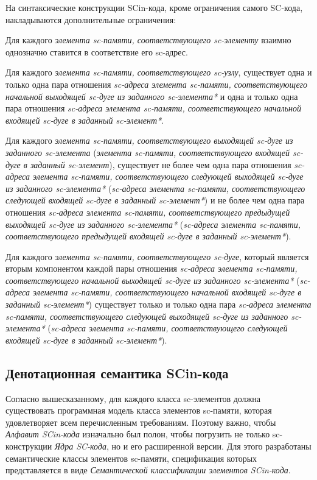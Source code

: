 На синтаксические конструкции SCin-кода, кроме ограничения самого SC-кода, накладываются дополнительные ограничения:
\begin{textitemize}
    \item Для каждого \textit{элемента sc-памяти, соответствующего sc-элементу} взаимно однозначно ставится в соответствие его sc-адрес.
    \item Для каждого \textit{элемента sc-памяти, соответствующего sc-узлу}, существует одна и только одна пара отношения \textit{sc-адреса элемента sc-памяти, соответствующего начальной выходящей sc-дуге из заданного sc-элемента*} и одна и только одна пара отношения \textit{sc-адреса элемента sc-памяти, соответствующего начальной входящей sc-дуге в заданный sc-элемент*}.
    \item Для каждого \textit{элемента sc-памяти, соответствующего выходящей sc-дуге из заданного sc-элемента} (\textit{элемента sc-памяти, соответствующего входящей sc-дуге в заданный sc-элемент}), существует не более чем одна пара отношения \textit{sc-адреса элемента sc-памяти, соответствующего следующей выходящей sc-дуге из заданного sc-элемента*} (\textit{sc-адреса элемента sc-памяти, соответствующего следующей входящей sc-дуге в заданный sc-элемент*}) и не более чем одна пара отношения \textit{sc-адреса элемента sc-памяти, соответствующего предыдущей выходящей sc-дуге из заданного sc-элемента*} (\textit{sc-адреса элемента sc-памяти, соответствующего предыдущей входящей sc-дуге в заданный sc-элемент*}).
    \item Для каждого \textit{элемента sc-памяти, соответствующего sc-дуге}, который является вторым компонентом каждой пары отношения \textit{sc-адреса элемента sc-памяти, соответствующего начальной выходящей sc-дуге из заданного sc-элемента*} (\textit{sc-адреса элемента sc-памяти, соответствующего начальной входящей sc-дуге в заданный sc-элемент*}) существует только и только одна пара \textit{sc-адреса элемента sc-памяти, соответствующего следующей выходящей sc-дуге из заданного sc-элемента*} (\textit{sc-адреса элемента sc-памяти, соответствующего следующей входящей sc-дуге в заданный sc-элемент*}).
\end{textitemize}

\subsection{Денотационная семантика SCin-кода}
\label{sec_soft_platform_scin_code_semantic}

Согласно вышесказанному, для каждого класса sc-элементов должна существовать программная модель класса элементов sc-памяти, которая удовлетворяет всем перечисленным требованиям. Поэтому важно, чтобы \textit{Алфавит SCin-кода} изначально был полон, чтобы погрузить не только sc-конструкции \textit{Ядра SC-кода}, но и его расширенной версии. Для этого разработаны семантические классы элементов sc-памяти, спецификация которых представляется в виде \textit{Семантической классификации элементов SCin-кода}.


